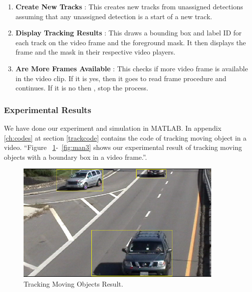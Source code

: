 \begin{enumerate}
    \item \textbf{Create New Tracks} : This creates new tracks from unassigned detections assuming that any unassigned detection is a start of a new track.
    
    \item \textbf{Display Tracking Results} : This draws a bounding box and label ID for each track on the video frame and the foreground mask. It then displays the frame and the mask in their respective video players.
    
    \item \textbf{Are More Frames Available} : This checks if more video frame is available in the video clip. If it is yes, then it goes to read frame procedure and continues. If it is no then , stop the process. 
    
    
    
\end{enumerate}
   
\subsubsection{Experimental Results}
    
    We have done our experiment and simulation in MATLAB. In appendix \ref{ch:codes} at section \ref{trackcode} contains the code of tracking moving object in a video. ``Figure ~\ref{fig:car1}-~\ref{fig:man3} shows our experimental result of tracking moving objects with a boundary box in a video frame.''.

\begin{figure}[H]
  \centering
  \includegraphics[width=0.9\textwidth]{figures/car1}
  \caption{Tracking Moving Objects Result.}
  \label{fig:car1}
\end{figure} 


